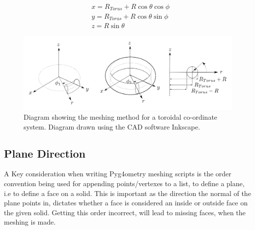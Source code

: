 \documentclass[12pt,a4paper]{article}
\begin{document}
\begin{equation}
\begin{aligned}
& x = R_{Torus} + R\cos{\theta}\cos{\phi} \\
& y = R_{Torus} + R\cos{\theta}\sin{\phi} \\
& z =  R\sin{\theta} 
\end{aligned}
\end{equation}

\begin{figure}[h!]
\centering
\includegraphics[scale=0.35]{Images//Coords/torus_coords.png}
\caption[width=\columnwidth]{Diagram showing the meshing method for a toroidal co-ordinate system. Diagram drawn using the CAD software Inkscape.}
\label{tormeshin}
\end{figure}

\subsection{Plane Direction}
\label{order}
A Key consideration when writing Pyg4ometry meshing scripts is the order convention being used for appending points/vertexes to a list, to define a plane, i.e to define a face on a solid. This is important as the direction the normal of the plane points in, dictates whether a face is considered an inside or outside face on the given solid. Getting this order incorrect, will lead to missing faces, when the meshing is made.
\end{document}
